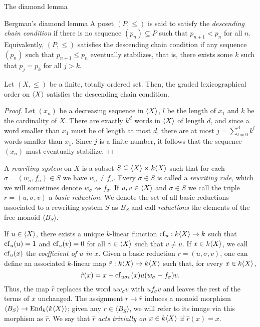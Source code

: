 \begin{chapter}{The diamond lemma}
\begin{section}{Bergman's diamond lemma}
A poset $(P,\leq)$ is said to satisfy the \emph{descending chain condition} if there is no sequence $(p_n)\subseteq P$ such that $p_{n+1}< p_n$ for all $n$. Equivalently, $(P,\leq)$ satisfies the descending chain condition if any sequence $(p_n)$ such that $p_{n+1} \leq p_n$ eventually stabilizes, that is, there exists some $k$ such that $p_j = p_k$ for all $j>k$.

\begin{lemma}\label{noeth} Let $(X,\leq)$ be a finite, totally ordered set. Then, the graded lexicographical order on $\langle X\rangle$ satisfies the descending chain condition.
\end{lemma}
\begin{proof} Let $(x_n)$ be a decreasing sequence in $\langle X\rangle$, $l$ be the length of $x_1$ and $k$ be the cardinality of $X$. There are exactly $k^d$ words in $\langle X\rangle$ of length $d$, and since a word smaller than $x_1$ must be of length at most $d$, there are at most $j=\sum_{l=0}^d k^l$ words smaller than $x_1$. Since $j$ is a finite number, it follows that the sequence $(x_n)$ must eventually stabilize.
\end{proof}

A \emph{rewriting system} on $X$ is a subset $S\subseteq \langle X\rangle \times k\langle X\rangle$ such that for each $\sigma=(w_\sigma, f_\sigma)\in S$ we have $w_\sigma \neq f_\sigma$. Every $\sigma \in S$ is called a \emph{rewriting rule}, which we will sometimes denote $w_\sigma \rightsquigarrow f_\sigma$. If $u,v\in\langle X\rangle$ and $\sigma\in S$ we call the triple $r=(u,\sigma,v)$ a \emph{basic reduction}. We denote the set of all basic reductions associated to a rewriting system $S$ as $B_S$ and call \emph{reductions} the elements of the free monoid $\langle B_S\rangle$.

If $u\in\langle X\rangle$, there exists a unique $k$-linear function $\mathrm{cf}_u:k\langle X\rangle\to k$ such that $\mathrm{cf}_u(u)=1$ and $\mathrm{cf}_u(v)=0$ for all $v\in\langle X\rangle$ such that $v\neq u$. If $x\in k\langle X\rangle$, we call $\mathrm{cf}_u(x)$ the \emph{coefficient of $u$ in $x$}. Given a basic reduction $r=(u,\sigma,v)$, one can define an associated $k$-linear map $\hat{r}:k\langle X\rangle\to k\langle X\rangle$ such that, for every $x\in k\langle X\rangle$,
\[\hat{r}(x)=x-\mathrm{cf}_{u\sigma v}(x) u(w_\sigma - f_\sigma)v.\]
Thus, the map $\hat{r}$ replaces the word $uw_\sigma v$ with $uf_\sigma v$ and leaves the rest of the terms of $x$ unchanged. The assignment $r\mapsto \hat{r}$ induces a monoid morphism $\langle B_S\rangle \to \operatorname{End}_k(k\langle X\rangle)$; given any $r\in\langle B_S\rangle$, we will refer to its image via this morphism as $\hat{r}$. We say that $\hat{r}$ \emph{acts trivially on $x\in k\langle X\rangle$} if $\hat{r}(x)=x$.


\end{section}
\end{chapter}
